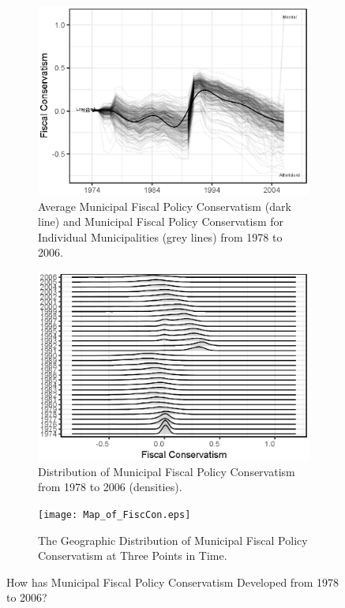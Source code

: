 \documentclass[a4paper,12pt]{article}
\begin{document}
	
\begin{figure}
\centering 
	\begin{subfigure}[h]{0.38\textwidth} 
	\includegraphics[width=1\textwidth]{times_lines_inflation_adjusted.eps}
	\caption{Average Municipal Fiscal Policy Conservatism (dark line) and Municipal Fiscal Policy Conservatism for Individual Municipalities (grey lines) from 1978 to 2006.}
	\label{fig:timeline}
			\end{subfigure} \hspace{1cm}
		\begin{subfigure}{0.38\textwidth} 
	\includegraphics[width=1\textwidth]{JoyPlotFiscal_inflation_adjusted.eps}
	\caption{Distribution of Municipal Fiscal Policy Conservatism from 1978 to 2006 (densities).}
	\label{fig:lines}
	\end{subfigure}


\hfill		\begin{subfigure}{0.9\textwidth} 
	\texttt{[image: Map\_of\_FiscCon.eps]}
	\caption{The Geographic Distribution of Municipal Fiscal Policy Conservatism at Three Points in Time.}
	\label{fig:map}
		\end{subfigure} 
	
	\caption{How has Municipal Fiscal Policy Conservatism Developed from 1978 to 2006?}
	\label{fig:descriptive}
	
\end{figure}
\end{document}

